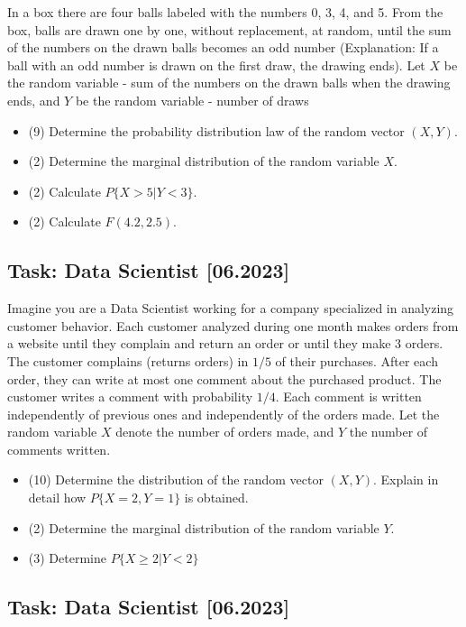 \documentclass[a4paper, 12pt]{article}
\begin{document}
In a box there are four balls labeled with the numbers 0, 3, 4, and 5. From the box, balls are drawn one by one, without replacement, at random, until the sum of the numbers on the drawn balls becomes an odd number (Explanation: If a ball with an odd number is drawn on the first draw, the drawing ends).  Let $X$ be the random variable - sum of the numbers on the drawn balls when the drawing ends, and $Y$ be the random variable - number of draws

\begin{itemize}
    \item [a)] (9) Determine the probability distribution law of the random vector $(X, Y)$.
    \item [b)] (2) Determine the marginal distribution of the random variable $X$.
    \item [c)] (2) Calculate $P\{X > 5 | Y < 3\}$.
    \item [d)] (2) Calculate $F(4.2, 2.5)$.
\end{itemize}

\subsection*{Task: Data Scientist [06.2023]}

Imagine you are a Data Scientist working for a company specialized in analyzing customer behavior. Each customer analyzed during one month makes orders from a website until they complain and return an order or until they make 3 orders. The customer complains (returns orders) in $1/5$ of their purchases. After each order, they can write at most one comment about the purchased product. The customer writes a comment with probability $1/4$. Each comment is written independently of previous ones and independently of the orders made. Let the random variable $X$ denote the number of orders made, and $Y$ the number of comments written.

\begin{itemize}
\item [a)] (10) Determine the distribution of the random vector $(X, Y)$. Explain in detail how $P\{X = 2, Y = 1\}$ is obtained.
\item [b)] (2) Determine the marginal distribution of the random variable $Y$.
\item [c)] (3) Determine $P\{X \geq 2 | Y < 2\}$
\end{itemize}


\subsection*{Task: Data Scientist [06.2023]}
\end{document}
